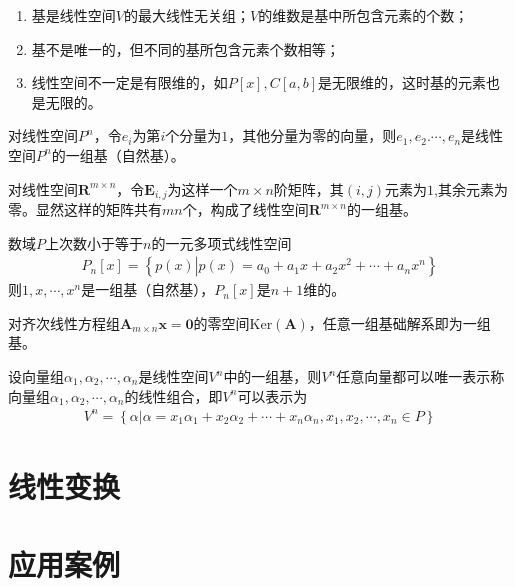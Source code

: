 \begin{remark}

    \begin{enumerate}[label=(\arabic*)]
        \item 基是线性空间$V$的最大线性无关组；$V$的维数是基中所包含元素的个数；
        \item 基不是唯一的，但不同的基所包含元素个数相等；
        \item 线性空间不一定是有限维的，如$P[x],C[a,b]$是无限维的，这时基的元素也是无限的。
    \end{enumerate}
\end{remark}

\begin{example}
    对线性空间$P^{n}$，令$e_{i}$为第$i$个分量为$1$，其他分量为零的向量，则$e_{1},e_{2}.\cdots,e_{n}$是线性空间$P^{n}$的一组基（自然基）。
\end{example}

\begin{example}
    对线性空间$\mathbf{R}^{m\times{n}}$，令$\mathbf{E}_{i,j}$为这样一个$m\times{n}$阶矩阵，其$(i,j)$元素为$1$,其余元素为零。显然这样的矩阵共有$mn$个，构成了线性空间$\mathbf{R}^{m\times{n}}$的一组基。
\end{example}

\begin{example}
    数域$P$上次数小于等于$n$的一元多项式线性空间
    \begin{eqnarray}
        P_{n}[x]=\left\{p(x)\left|p(x)=a_{0}+a_{1}x+a_{2}x^{2}+\cdots+a_{n}x^{n}\right.\right\}\nonumber
    \end{eqnarray}
    则$1,x,\cdots,x^{n}$是一组基（自然基），$P_{n}[x]$是$n+1$维的。
\end{example}

\begin{example}
    对齐次线性方程组$\mathbf{A}_{m\times{n}}\mathbf{x=0}$的零空间$\text{Ker}(\mathbf{A})$，任意一组基础解系即为一组基。
\end{example}

\begin{theorem}
    设向量组$\alpha_{1},\alpha_{2},\cdots,\alpha_{n}$是线性空间$V^{n}$中的一组基，则$V^{n}$任意向量都可以唯一表示称向量组$\alpha_{1},\alpha_{2},\cdots,\alpha_{n}$的线性组合，即$V^{n}$可以表示为
    \begin{eqnarray}
        V^{n}=\left\{\alpha\left|\alpha=x_{1}\alpha_{1}+x_{2}\alpha_{2}+\cdots+x_{n}\alpha_{n},x_{1},x_{2},\cdots,x_{n}\in{P}\right.\right\}\nonumber
    \end{eqnarray}
\end{theorem}
\section{线性变换}
\section{应用案例}

